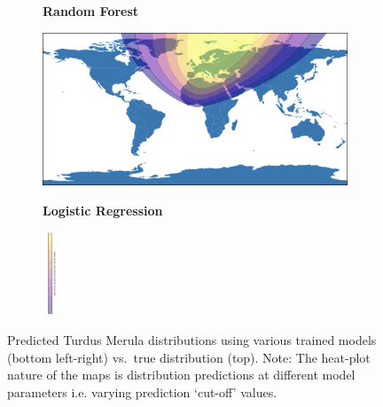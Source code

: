 \begin{figure}[hbt!]
\begin{subfigure}{.23\linewidth}
\vspace*{-3ex}  
\begin{center}
\textbf{Random Forest}
\end{center}
\end{subfigure} %
\begin{subfigure}{.23\linewidth}
  \includegraphics[width=\linewidth]{Images/Screenshot 2023-11-15 at 14.59.56.png}
\vspace*{-3ex}  
\begin{center}
\textbf{Logistic Regression}
\end{center}
\end{subfigure}
\begin{subfigure}{.04\linewidth}
  \includegraphics[width=\linewidth, height = 2.5cm]{Images/Screenshot 2023-11-19 at 12.10.01.png}
\end{subfigure}


\caption{Predicted Turdus Merula distributions using various trained models (bottom left-right) vs.\ true distribution (top). Note: The heat-plot nature of the maps is distribution predictions at different model parameters i.e. varying prediction `cut-off' values.}
\label{fig:map}
\end{figure}



